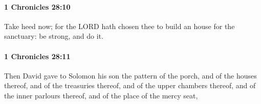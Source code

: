 		\paragraph{1 Chronicles 28:10} %
			\label{1CHRONICLES-28-10}

			Take heed now; for the LORD hath chosen thee to build an house for the sanctuary: be strong, and do it.


		\paragraph{1 Chronicles 28:11} %
			\label{1CHRONICLES-28-11}

			Then David gave to Solomon his son the pattern of the porch, and of the houses thereof, and of the treasuries thereof, and of the upper chambers thereof, and of the inner parlours thereof, and of the place of the mercy seat,


